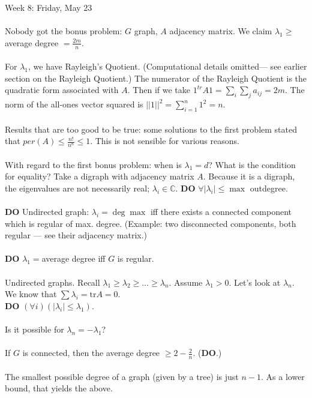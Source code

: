 \documentclass[12pt]{article}
\theoremstyle{remark}
\newcommand{\C}{\mathbb{C}}
\newcommand{\tr}{\mathrm{tr}}
\begin{document}
\begin{section}{Week 8: Friday, May 23}
\\\\
Nobody got the bonus problem: $G$ graph, $A$ adjacency matrix. We claim $\lambda_1 \geq$ average degree $ = \frac{2m}{n}$. 
\\\\
For $\lambda_1$, we have Rayleigh's Quotient. (Computational details omitted--- see earlier section on the Rayleigh Quotient.) The numerator of the Rayleigh Quotient is the quadratic form associated with $A$. Then if we take $1^{tr} A 1 = \sum_i \sum_j a_{ij} = 2m$. The norm of the all-ones vector squared is $||1||^2 = \sum_{i=1}^n 1^2 = n$. 
\\\\
Results that are too good to be true: some solutions to the first problem stated that $per (A) \leq \frac{n!}{n^n} \leq 1$. This is not sensible for various reasons.
\\\\
With regard to the first bonus problem: when is $\lambda_1 = d$? What is the condition for equality? Take a digraph with adjacency matrix $A$. Because it is a digraph, the eigenvalues are not necessarily real; $\lambda_i \in \C$. \textbf{DO} $\forall |\lambda_i| \leq \max$ outdegree.
\\\\
\textbf{DO} Undirected graph: $\lambda_i = \deg \max$ iff there exists a connected component which is regular of max. degree. (Example: two disconnected components, both regular --- see their adjacency matrix.) 
\\\\
\textbf{DO} $\lambda_1 = $average degree iff $G$ is regular.
\\\\
Undirected graphs. Recall $\lambda_1 \geq \lambda_2 \geq \ldots \geq \lambda_n$. Assume $\lambda_1 > 0$. Let's look at $\lambda_n$. We know that $\sum \lambda_i = \tr A = 0$. 
\\\textbf{DO} $(\forall i)(|\lambda_i| \leq \lambda_1)$.
\\\\Is it possible for $\lambda_n = - \lambda_1$?
\\\\
If $G$ is connected, then the average degree $\geq 2 - \frac 2 n$. (\textbf{DO}.)
\\\\
The smallest possible degree of a graph (given by a tree) is just $n-1$. As a lower bound, that yields the above.
\\\\

\end{section}
\end{document}
